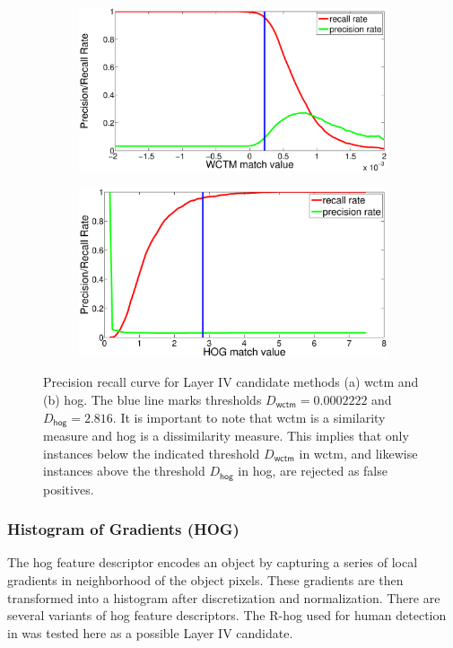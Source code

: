 \documentclass {udthesis}
\begin{document}
%
\begin{figure}
  \centering
  \begin{subfigure}{0.45\textwidth}
      \includegraphics[width=\textwidth]{layer4_precision_recall}
      \caption{}
      \label{subfig:layer4_precision_recall}
  \end{subfigure}
  \begin{subfigure}{0.45\textwidth}
      \includegraphics[width=\textwidth]{layer4_hog_precision_recall}       
      \caption{}
      \label{subfig:hog_precision_recall}
  \end{subfigure}
  \caption{Precision recall curve for Layer IV candidate methods (a) \gls{wctm} and (b) \gls{hog}. The blue line marks thresholds $D_\mathsf{wctm}=0.0002222$ and $D_\mathsf{hog}=2.816$. It is important to note that \gls{wctm} is a similarity measure and \gls{hog} is a dissimilarity measure. This implies that only instances below the indicated threshold $D_\mathsf{wctm}$ in \gls{wctm}, and likewise instances above the threshold $D_\mathsf{hog}$ in \gls{hog}, are rejected as false positives. }
\end{figure}

\subsubsection{Histogram of Gradients (HOG)}
The \gls{hog} feature descriptor encodes an object by capturing a series of local gradients in neighborhood of the object pixels. 
These gradients are then transformed into a histogram after discretization and normalization. 
There are several variants of \gls{hog} feature descriptors. 
The \textsc{R-}\gls{hog} used for human detection in \cite{dalal} was tested here as a possible Layer IV candidate.
\end{document}
